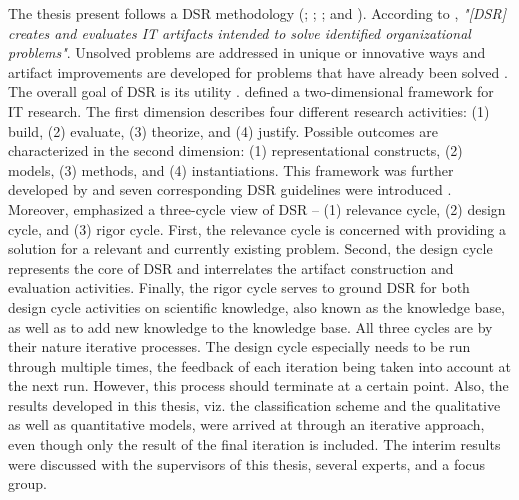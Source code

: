 The thesis present follows a \acf{DSR} methodology (\citealp{March1995}; \citealp{Hevner2004}; \citealp{Hevner2007}; and \citealp{Peffers2007}). According to \citet[p. 77]{Hevner2004}, \textit{"[\ac{DSR}] creates and evaluates IT artifacts intended to solve identified organizational problems"}. Unsolved problems are addressed in unique or innovative ways and artifact improvements are developed for problems that have already been solved \citep[p. 81]{Hevner2004}. The overall goal of \ac{DSR} is its utility \citep[p. 80]{Hevner2004}. \citet[pp. 255-262]{March1995} defined a two-dimensional framework for \ac{IT} research. The first dimension describes four different research activities: (1) build, (2) evaluate, (3) theorize, and (4) justify. Possible outcomes are characterized in the second dimension: (1) representational constructs, (2) models, (3) methods, and (4) instantiations. This framework was further developed by \citet[pp. 78-81]{Hevner2004} and seven corresponding \ac{DSR} guidelines were introduced \citep[pp. 82-90]{Hevner2004}. Moreover, \citet[pp. 87-92]{Hevner2007} emphasized a three-cycle view of \ac{DSR} -- (1) relevance cycle, (2) design cycle, and (3) rigor cycle. First, the relevance cycle is concerned with providing a solution for a relevant and currently existing problem. Second, the design cycle represents the core of \ac{DSR} and interrelates the artifact construction and evaluation activities. Finally, the rigor cycle serves to ground \ac{DSR} for both design cycle activities on scientific knowledge, also known as the knowledge base, as well as to add new knowledge to the knowledge base. All three cycles are by their nature iterative processes. The design cycle especially needs to be run through multiple times, the feedback of each iteration being taken into account at the next run. However, this process should terminate at a certain point. Also, the results developed in this thesis, viz. the classification scheme and the qualitative as well as quantitative models, were arrived at through an iterative approach, even though only the result of the final iteration is included. The interim results were discussed with the supervisors of this thesis, several experts, and a focus group.

